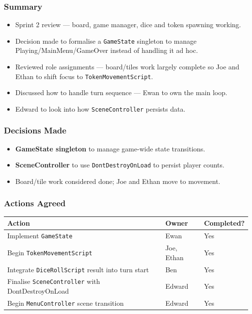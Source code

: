 \subsubsection*{Summary}
\begin{itemize}
    \item Sprint 2 review --- board, game manager, dice and token spawning working.
    \item Decision made to formalise a \texttt{GameState} singleton to manage Playing/MainMenu/GameOver instead of handling it ad hoc.
    \item Reviewed role assignments --- board/tiles work largely complete so Joe and Ethan to shift focus to \texttt{TokenMovementScript}.
    \item Discussed how to handle turn sequence --- Ewan to own the main loop.
    \item Edward to look into how \texttt{SceneController} persists data.
\end{itemize}

\subsubsection*{Decisions Made}
\begin{itemize}
    \item \textbf{GameState singleton} to manage game-wide state transitions.
    \item \textbf{SceneController} to use \texttt{DontDestroyOnLoad} to persist player counts.
    \item Board/tile work considered done; Joe and Ethan move to movement.
\end{itemize}

\subsubsection*{Actions Agreed}
\begin{table}[H]
\centering
\begin{tabular}{|p{8cm}|l|l|}
\hline
\textbf{Action} & \textbf{Owner} & \textbf{Completed?} \\ \hline
Implement \texttt{GameState} & Ewan & Yes \\ \hline
Begin \texttt{TokenMovementScript} & Joe, Ethan & Yes \\ \hline
Integrate \texttt{DiceRollScript} result into turn start & Ben & Yes \\ \hline
Finalise \texttt{SceneController} with DontDestroyOnLoad & Edward & Yes \\ \hline
Begin \texttt{MenuController} scene transition & Edward & Yes \\ \hline
\end{tabular}
\end{table}

